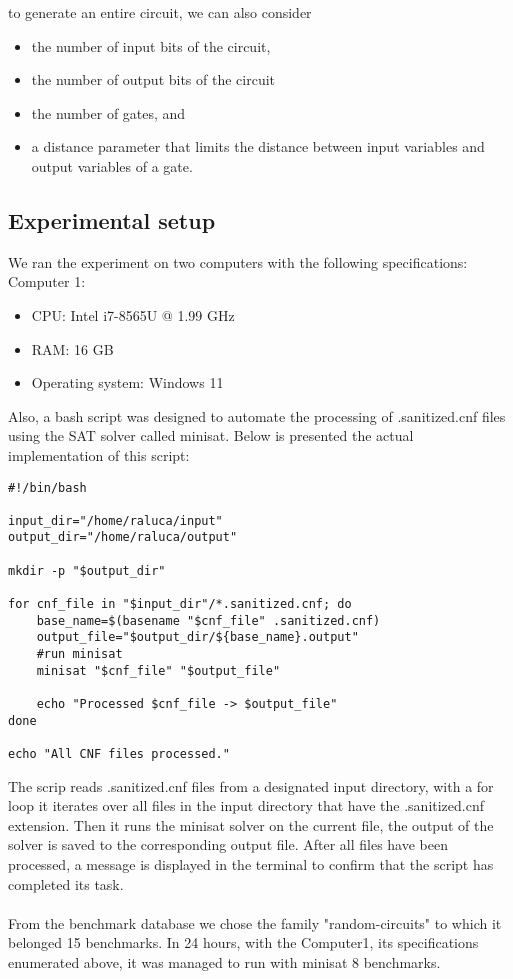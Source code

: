 \documentclass[runningheads]{llncs}
\begin{document}
to generate an entire circuit, we can also consider 
\begin{itemize}
  \item the number of input bits of the circuit,
  \item the number of output bits of the circuit
   \item the number of gates, and 
    \item a distance parameter that limits the distance between input variables and output variables of a gate.
\end{itemize}

\subsection{Experimental setup}

We ran the experiment on two computers with the following specifications:\\

Computer 1: 
\begin{itemize}
  \item CPU: Intel i7-8565U @ 1.99 GHz
  \item RAM: 16 GB
   \item Operating system: Windows 11
\end{itemize}

Also, a bash script was designed to automate the processing of .sanitized.cnf files using the SAT solver called minisat. Below is presented the actual implementation of this script: 
\begin{lstlisting}
#!/bin/bash

input_dir="/home/raluca/input"
output_dir="/home/raluca/output"

mkdir -p "$output_dir" 

for cnf_file in "$input_dir"/*.sanitized.cnf; do
    base_name=$(basename "$cnf_file" .sanitized.cnf)    
    output_file="$output_dir/${base_name}.output"
    #run minisat
    minisat "$cnf_file" "$output_file"

    echo "Processed $cnf_file -> $output_file"
done

echo "All CNF files processed."
\end{lstlisting}
The scrip reads .sanitized.cnf files from a designated input directory, with a for loop it iterates over all files in the input directory that have the .sanitized.cnf extension. Then it runs the minisat solver on the current file, the output of the solver is saved to the corresponding output file. After all files have been processed, a message is displayed in the terminal to confirm that the script has completed its task.
\\
\\
From the benchmark database we chose the family "random-circuits" to which it belonged 15 benchmarks. In 24 hours, with the Computer1, its specifications enumerated above, it was managed to run with minisat 8 benchmarks. \\
\end{document}
